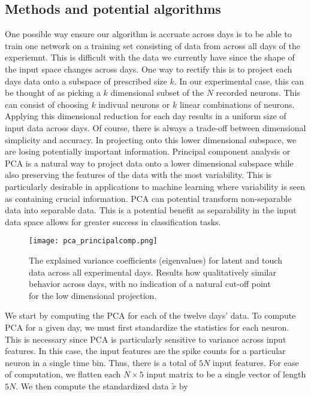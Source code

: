 \documentclass[12pt]{article}
\begin{document}
\subsection{Methods and potential algorithms}
One possible way ensure our algorithm is accruate across days is to be able to train one network on a training set consisting of data from across all days of the experiemnt. This is difficult with the data we currently have since the shape of the input space changes across days. One way to rectify this is to project each days data onto a subspace of prescribed size $k$. In our experimental case, this can be thought of as picking a $k$ dimensional subset of the $N$ recorded neurons. This can consist of choosing $k$ indivual neurons or $k$ linear combinations of neurons. Applying this dimensional reduction for each day results in a uniform size of input data across days. Of course, there is always a trade-off between dimensional simplicity and accuracy. In projecting onto this lower dimensional subspace, we are losing potentially important information. Principal component analysis or PCA is a natural way to project data onto a lower dimensional subspace while also preserving the features of the data with the most variability. This is particularly desirable in applications to machine learning where variability is seen as containing crucial information. PCA can potential transform non-separable data into separable data. This is a potential benefit as separability in the input data space allows for greater success in classification tasks.\\
\begin{figure}
  \centering
 \texttt{[image: pca\_principalcomp.png]}
 \caption{The explained variance coefficients (eigenvalues) for latent and touch data across all experimental days. Results how qualitatively similar behavior across days, with no indication of a natural cut-off point for the low dimensional projection.}
 \label{ref:pca}
 \end{figure}
We start by computing the PCA for each of the twelve days' data. To compute PCA for a given day, we must first standardize the statistics for each neuron. This is necessary since PCA is particularly sensitive to variance across input features. In this case, the input features are the spike counts for a particular neuron in a single time bin. Thus, there is a total of $5N$ input features.  For ease of computation, we  flatten each $N\times5$ input matrix to be a single vector of length $5N$.  We then compute the standardized data $\tilde{x}$ by
\end{document}
